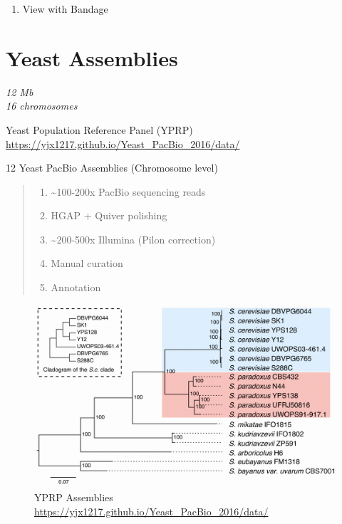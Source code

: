 \documentclass[
]{book}
\providecommand{\tightlist}{%
  \setlength{\itemsep}{0pt}\setlength{\parskip}{0pt}}
\begin{document}
\begin{enumerate}
\def\labelenumi{\arabic{enumi}.}
\setcounter{enumi}{2}
\tightlist
\item
  View with Bandage
\end{enumerate}

\hypertarget{yeast-assemblies-1}{%
\section{Yeast Assemblies}\label{yeast-assemblies-1}}

\emph{12 Mb}\\
\emph{16 chromosomes}

Yeast Population Reference Panel (YPRP) \url{https://yjx1217.github.io/Yeast_PacBio_2016/data/}

12 Yeast PacBio Assemblies (Chromosome level)

\begin{quote}
\begin{enumerate}
\def\labelenumi{\arabic{enumi}.}
\tightlist
\item
  \textasciitilde100-200x PacBio sequencing reads
\item
  HGAP + Quiver polishing\\
\item
  \textasciitilde200-500x Illumina (Pilon correction)\\
\item
  Manual curation\\
\item
  Annotation
\end{enumerate}
\end{quote}

\begin{figure}
\centering
\includegraphics[width=1\textwidth,height=\textheight]{./Figures/Yeast.png}
\caption{YPRP Assemblies \url{https://yjx1217.github.io/Yeast_PacBio_2016/data/}}
\end{figure}
\end{document}
